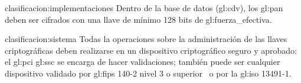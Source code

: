 {clasificacion:implementaciones}
{
  Dentro de la base de datos (\gls{gl:cdv}), los \gls{gl:pan} deben ser
  cifrados con una llave de mínimo 128 bits de \gls{gl:fuerza_efectiva}.
}

{clasificacion:sistema}
{
  Todas la operaciones sobre la administración de las llaves criptográficas
  deben realizarse en un dispositivo criptográfico seguro y aprobado: el
  \gls{gl:pci} \gls{gl:ssc} se encarga de hacer validaciones; también puede ser
  cualquier dispositivo validado por \gls{gl:fips} 140-2 nivel 3 o
  superior~\cite{nist_modulos_criptograficos} o por la \gls{gl:iso} 13491-1.
}
